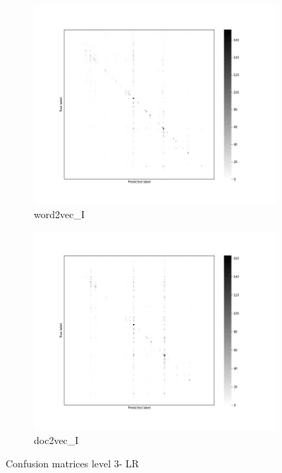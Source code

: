 \documentclass[12pt, a4paper, titlepage]{article}
\begin{document}
\begin{figure}
  \begin{subfigure}[b]{0.475\textwidth}   
    \centering 
    \includegraphics[width=\textwidth]{cm_word2vec_without_LR_3.jpg}
    {{\small word2vec\_I}}    
  \end{subfigure}
  \hfill
  \begin{subfigure}[b]{0.475\textwidth}   
      \centering 
      \includegraphics[width=\textwidth]{cm_doc2vec_without_LR_3.jpg}
      {{\small doc2vec\_I}}    
  \end{subfigure}
  \caption{\label{fig: F21} Confusion matrices level 3- LR}
\end{figure}
\end{document}
